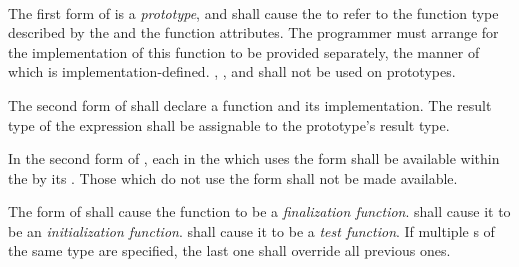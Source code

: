 \begin{grammar}
 \\
	    \\
	    \terminal{=}  \\

 \\
	 \\
	  \\

 \\
	 \\
	 \\
	 \\
	 \\
\end{grammar}

\specsubsubitem
The first form of  is a \textit{prototype},
and shall cause the  to refer to the function type
described by the  and the function attributes. The
programmer must arrange for the implementation of this function to be provided
separately, the manner of which is implementation-defined. ,
, and  shall not be used on prototypes.

\specsubsubitem
The second form of  shall declare a function
and its implementation. The result type of the expression shall be assignable
to the prototype's result type.

\specsubsubitem
In the second form of , each
 in the  which uses the
 form shall be available within the 
by its . Those which do not use the  form
shall not be made available.

\specsubsubitem
The  form of  shall cause the
function to be a \textit{finalization function}.  shall cause it
to be an \textit{initialization function}.  shall cause it to be
a \textit{test function}. If multiple s of the same type
are specified, the last one shall override all previous ones.

